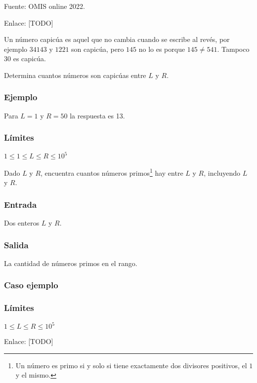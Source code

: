 Fuente: OMIS online 2022.

Enlace: [TODO]

\problembreak

\problemtitle Un número capicúa es aquel que no cambia cuando se escribe al revés, por ejemplo \(34143\) y \(1221\) son capicúa, pero \(145\) no lo es porque \(145\neq 541\). Tampoco \(30\) es capicúa.

Determina cuantos números son capicúas entre \(L\) y \(R\).

\subsubsection*{Ejemplo}
Para \(L=1\) y \(R=50\) la respuesta es 13.

\subsubsection*{Límites}
\(1 \leq 1  \leq L \leq R \leq 10^5 \)

\problembreak

\problemtitle Dado \(L\) y \(R\), encuentra cuantos números primos\footnote{Un número es primo si y solo si tiene exactamente dos divisores positivos, el \(1\) y el mismo.} hay entre \(L\) y \(R\), incluyendo \(L\) y \(R\).
 

\subsubsection*{Entrada}
Dos enteros \(L\) y \(R\).
\subsubsection*{Salida}
La cantidad de números primos en el rango.
\subsubsection{Caso ejemplo}
\begin{casebox3}
\end{casebox3}

\subsubsection*{Límites}
\begin{plimits}
	\item \(1\leq L \leq R \leq 10^5\)
\end{plimits}

Enlace: [TODO]
